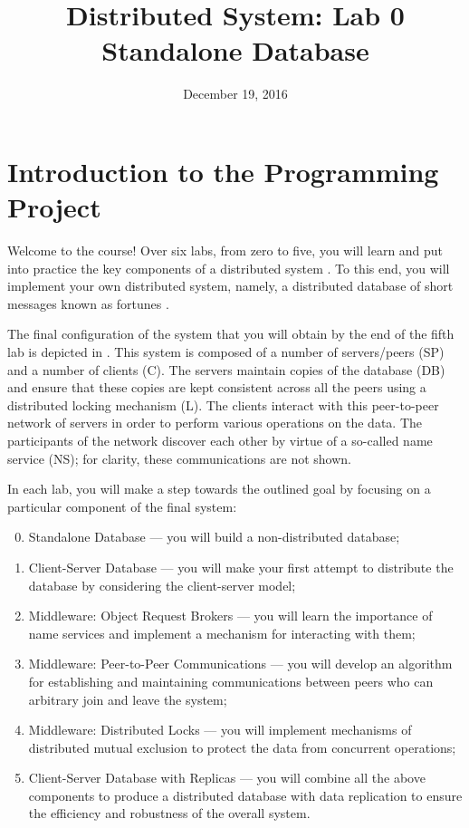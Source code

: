\documentclass[a4paper,10pt]{article}
\title{Distributed System: Lab 0\\Standalone Database}
\author{}
\date{December 19, 2016}
\begin{document}
\maketitle

\section{Introduction to the Programming Project} 

Welcome to the course! Over six labs, from zero to five, you will learn and put
into practice the key components of a distributed system \cite{lecture1}. To
this end, you will implement your own distributed system, namely, a distributed
database of short messages known as fortunes \cite{fortune}.

The final configuration of the system that you will obtain by the end of the
fifth lab is depicted in . This system is composed of
a number of servers/peers (SP) and a number of clients (C). The servers maintain
copies of the database (DB) and ensure that these copies are kept consistent
across all the peers using a distributed locking mechanism (L). The clients
interact with this peer-to-peer network of servers in order to perform various
operations on the data. The participants of the network discover each other by
virtue of a so-called name service (NS); for clarity, these communications are
not shown.

In each lab, you will make a step towards the outlined goal by focusing on a
particular component of the final system:
\begin{enumerate}

  \setcounter{enumi}{-1}

  \item Standalone Database --- you will build a non-distributed database;

  \item Client-Server Database --- you will make your first attempt to
  distribute the database by considering the client-server model;

  \item Middleware: Object Request Brokers --- you will learn the importance of
  name services and implement a mechanism for interacting with them;

  \item Middleware: Peer-to-Peer Communications --- you will develop an
  algorithm for establishing and maintaining communications between peers who
  can arbitrary join and leave the system;

  \item Middleware: Distributed Locks --- you will implement mechanisms of
  distributed mutual exclusion to protect the data from concurrent operations;

  \item Client-Server Database with Replicas --- you will combine all the above
  components to produce a distributed database with data replication to ensure
  the efficiency and robustness of the overall system.

\end{enumerate}
\end{document}

